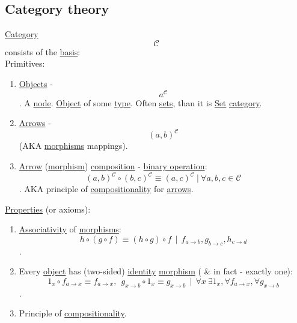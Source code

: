 \documentclass[11pt]{article}
\begin{document}
\subsection{\label{org75d1013}Category theory}
\label{sec:org31dd512}
\hyperref[org3e3a79b]{Category} $$ \mathcal{C} $$ consists of the \hyperref[org5650c52]{basis}:\\

Primitives:\\
\begin{enumerate}
\item \hyperref[orge0f000f]{Objects} - $$ a^{\mathcal{C}} $$. A \hyperref[org25ccf6c]{node}. \hyperref[org025aac8]{Object} of some \hyperref[org4fbaeb8]{type}. Often \hyperref[org4e7443a]{sets}, than it is \hyperref[orgbed80ba]{Set} \hyperref[org3e3a79b]{category}.\\
\item \hyperref[org33f3f3f]{Arrows} - $$ {(a,b)}^{\mathcal{C}} $$ (AKA \hyperref[org8ed0ce8]{morphisms} mappings).\\
\item \hyperref[org5b6e6e9]{Arrow} (\hyperref[orgad99fc6]{morphism}) \hyperref[org24a8abd]{composition} - \hyperref[orgd89f717]{binary operation}: $$ {(a, b)}^{\mathcal{C}} \circ {(b, c)}^{\mathcal{C}} \equiv {(a, c)}^{\mathcal{C}} \ | \ \forall a, b, c \in \mathcal{C} $$. AKA principle of \hyperref[org565c544]{compositionality} for \hyperref[org33f3f3f]{arrows}.\\
\end{enumerate}

\hyperref[org763ad6b]{Properties} (or axioms):\\
\begin{enumerate}
\item \hyperref[org8a2c45d]{Associativity} of \hyperref[org8ed0ce8]{morphisms}: $$ {h} \circ ({g} \circ {f}) \equiv ({h} \circ {g}) \circ {f} \ \ | \ \ {f}_{a \to b}, {g}_{b \to c}, {h}_{c \to d} $$.\\
\item Every \hyperref[org025aac8]{object} has (two-sided) \hyperref[org3bbbadd]{identity} \hyperref[orgad99fc6]{morphism} ( \& in fact - exactly one): $$ {1}_x \circ {f}_{a \to x} \equiv {f}_{a \to x}, \ \ {g}_{x \to b} \circ {1_x} \equiv {g}_{x \to b } \ \ | \ \ \forall x \ \exists {1}_{x}, \forall {f}_{a \to x},  \forall {g}_{x \to b} $$.\\
\item Principle of \hyperref[org565c544]{compositionality}.\\
\end{enumerate}
\end{document}
